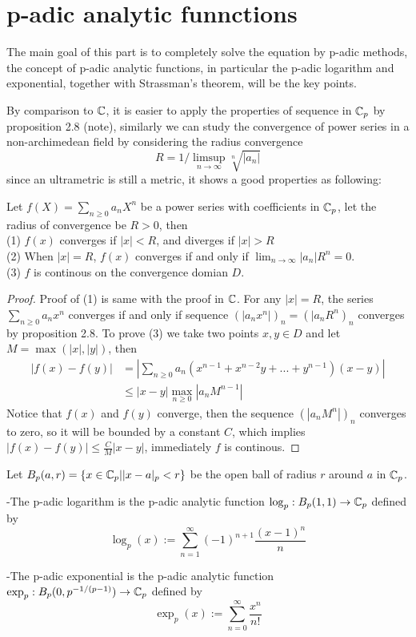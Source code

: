 \section{p-adic analytic funnctions}

The main goal of this part is to completely solve the equation by p-adic methods, the concept of p-adic analytic functions, in particular the p-adic logarithm and exponential, together with Strassman's theorem, will be the key points.

By comparison to \(\mathbb{C}\), it is easier to apply the properties of sequence in \(\mathbb{C}_p\) by proposition 2.8 (note), similarly we can study the convergence of power series in a non-archimedean field by considering the radius convergence
\[R = 1/\limsup_{n \rightarrow \infty}\sqrt[n]{|a_n|}\]
since an ultrametric is still a metric, it shows a good properties as following:
\begin{proposition}
    Let \(f(X)=\sum_{n \geq 0}a_nX^n\) be a power series with coefficients in \(\mathbb{C}_p\), let the radius of convergence be \(R>0\), then\\
    (1) \(f(x)\) converges if \(|x|<R\), and diverges if \(|x|>R\)\\
    (2) When \(|x|=R\), \(f(x)\) converges if and only if \(\lim_{n \rightarrow \infty}|a_n|R^n = 0\). \\
    (3) \(f\) is continous on the convergence domian \(D\).

    \begin{proof}
        Proof of (1) is same with the proof in \(\mathbb{C}\). For any \(|x|=R\), the series \(\sum_{n \geq 0}a_nx^n\) converges if and only if sequence \((|a_nx^n|)_{n} = (|a_nR^n)_{n}\) converges by proposition 2.8. To prove (3) we take two points \(x,y\in D\) and let \(M = \max(|x|,|y|)\), then
        \begin{align*}
            |f(x)-f(y)| &= |\sum_{n \geq 0}a_n(x^{n-1}+x^{n-2}y+...+y^{n-1})(x-y)| \\
            &\leq |x-y|\max_{n\geq 0}{|a_nM^{n-1}|}
        \end{align*}
        Notice that \(f(x)\) and \(f(y)\) converge, then the sequence \((|a_nM^n|)_{n}\) converges to zero, so it will be bounded by a constant \(C\), which implies \(|f(x)-f(y)|\leq\frac{C}{M}|x-y|\), immediately \(f\) is continous.
    \end{proof}
\end{proposition}


\begin{definition}
    Let \(B_p(a,r) = \{x \in \mathbb{C}_p| |x-a|_p <r \}\) be  the open ball of radius \(r\) around \(a\) in \(\mathbb{C}_p\).

    -The p-adic logarithm is the p-adic analytic function \(\log_p: B_p(1,1) \to \mathbb{C}_p\) defined by
    \[\log_p(x) := \sum_{n=1}^{\infty} (-1)^{n+1} \frac{(x-1)^n}{n}\]

    -The p-adic exponential is the p-adic analytic function \(\exp_p : B_p(0,p^{-1/(p-1)}) \to \mathbb{C}_p\) defined by
    \[\exp_p (x) :=  \sum_{n=0}^{\infty} \frac{x^n}{n!}\]
\end{definition}

